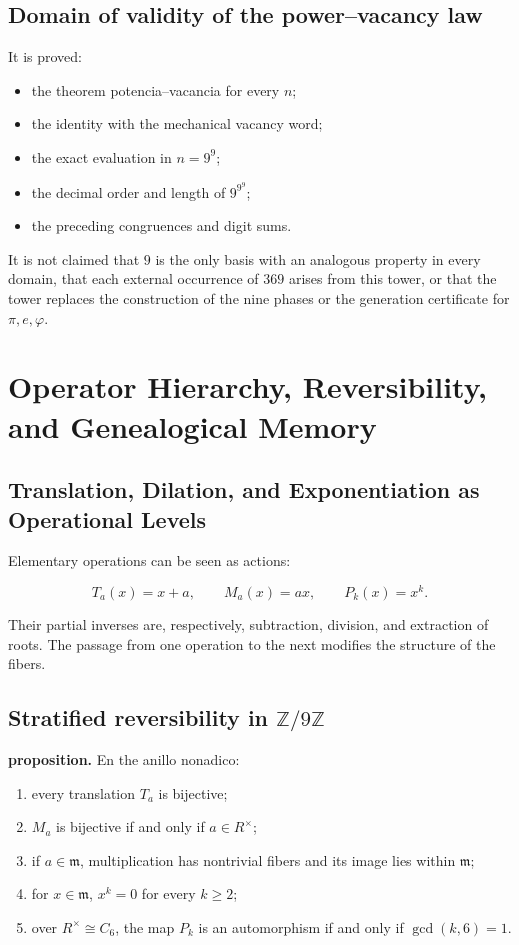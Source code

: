\subsection{Domain of validity of the power--vacancy law}

It is proved:

\begin{itemize}
\item the theorem potencia–vacancia for every \(n\);
\item the identity with the mechanical vacancy word;
\item the exact evaluation in \(n=9^9\);
\item the decimal order and length of \(9^{9^9}\);
\item the preceding congruences and digit sums.
\end{itemize}

It is not claimed that \(9\) is the only basis with an analogous property in every domain, that each external occurrence of \(369\) arises from this tower, or that the tower replaces the construction of the nine phases or the generation certificate for \(\pi,e,\varphi\).


\section{Operator Hierarchy, Reversibility, and Genealogical Memory}

\subsection{Translation, Dilation, and Exponentiation as Operational Levels}

Elementary operations can be seen as actions:

\[
T_a(x)=x+a,\qquad
M_a(x)=ax,\qquad
P_k(x)=x^k.
\]

Their partial inverses are, respectively, subtraction, division, and extraction of roots. The passage from one operation to the next modifies the structure of the fibers.

\subsection{Stratified reversibility in \(\mathbb Z/9\mathbb Z\)}

\textbf{proposition.} En the anillo nonadico:

\begin{enumerate}
\item every translation \(T_a\) is bijective;
\item \(M_a\) is bijective if and only if \(a\in R^\times\);
\item if \(a\in\mathfrak m\), multiplication has nontrivial fibers and
its image lies within \(\mathfrak m\);
\item for \(x\in\mathfrak m\), \(x^k=0\) for every \(k\ge2\);
\item over \(R^\times\cong C_6\), the map \(P_k\) is an automorphism if and only if \(\gcd(k,6)=1\).
\end{enumerate}

